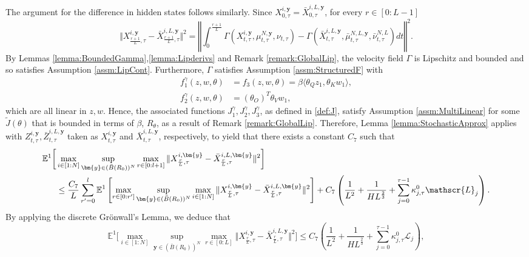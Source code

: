 \documentclass{article}
\begin{document}
\begin{appendices}
The argument for the difference in hidden states follows similarly. Since $X^{i,\bm{y}}_{0,\tau} = \bar X^{i,L,\bm{y}}_{0,\tau}$, for every $r\in[0:L-1]$
\[
\Vert X^{i,\bm{y}}_{\frac{r+1}{L},\tau} - \bar X^{i,L,\bm{y}}_{\frac{r+1}{L},\tau}\Vert^2 = \left\Vert \int_0^\frac{r+1}{L}\Gamma(X^{i,\bm{y}}_{t,\tau}, \mu^{N,\bm{y}}_{t,\tau},\nu_{t,\tau})-\Gamma(\bar X^{i,L,\bm{y}}_{t,\tau},\bar \mu^{N,L,\bm{y}}_{t,\tau},\bar \nu^{N,L}_{t,\tau})dt\right\Vert^2.
\]
By Lemmas \ref{lemma:BoundedGamma},\ref{lemma:Lipderivs}  and Remark \ref{remark:GlobalLip}, the velocity field $\Gamma$ is Lipschitz and bounded and so satisfies Assumption \ref{assm:LipCont}. Furthermore, $\Gamma$ satisfies Assumption \ref{assm:StructuredF} with
\begin{align*}
    f_1^\gamma(z,w,\theta) &=f_3(z,w,\theta)= \beta \langle \theta_Q z_1,\theta_K w_1 \rangle,\\
    f_2^\gamma(z,w,\theta) &=(\theta_O)^T\theta_V w_1 ,
\end{align*}
which are all linear in $z,w$. Hence, the associated functions $J^\gamma_1,J^\gamma_2,J^\gamma_3$, as defined in \ref{def:J}, satisfy Assumption \ref{assm:MultiLinear} for some $\widetilde J(\theta)$ that is bounded in terms of $\beta$, $R_\theta$, as a result of Remark \ref{remark:GlobalLip}.
Therefore, Lemma \ref{lemma:StochasticApprox} applies with $Z^{i,\bm{y}}_{t,\tau}, \bar Z^{i,L,\bm{y}}_{t,\tau}$ taken as $X^{i,\bm{y}}_{t,\tau}$ and $\bar X^{i,L,\bm{y}}_{t,\tau}$, respectively, to yield that there exists a constant $C_7$ such that
\begin{align*}
    \mathbb E^1\bigg[&\max_{i\in[1:N]}\sup_{\bm{y}\in (\bar B(R_0))^N}\max_{r\in[0:l+1]}\Vert X^{i,\bm{y}}_{\frac{r}{L},\tau} - \bar X^{i,L,\bm{y}}_{\frac{r}{L},\tau}\Vert^2 \bigg] \\&\le  \frac{C_7}{L}\sum_{r'=0}^l\mathbb E^1\left[\max_{ r \in[0:r']}\sup_{\bm{y}\in (\bar B(R_0))^N}\max_{i \in[1:N]} \Vert X^{i,\bm{y}}_{\frac{r}{L},\tau}-\bar X^{i,L,\bm{y}}_{\frac{r}{L},\tau}\Vert^2\right]\notag+C_7\left(\frac{1}{L^2}+\frac{1}{HL^{\frac{2}{3}}}+\sum_{j=0}^{\tau-1}\kappa^0_{j,\tau}\mathscr{L}_j\right).
\end{align*}
By applying the discrete Gr\"onwall's Lemma, we deduce that
\begin{equation}\label{eqn:boundXfinal}
       \mathbb E^1\bigg[\max_{i\in[1:N]}\sup_{\bm{y}\in (\bar B(R_0))^N}\max_{r\in[0:L]}\Vert X^{i,\bm{y}}_{\frac{r}{L},\tau} - \bar X^{i,L,\bm{y}}_{\frac{r}{L},\tau}\Vert^2\bigg] \le  C_7\left(\frac{1}{L^2}+\frac{1}{HL^{\frac{2}{3}}}+\sum_{j=0}^{\tau-1}\kappa^0_{j,\tau}\mathscr{L}_j\right),

\end{equation}
\end{appendices}
\end{document}
